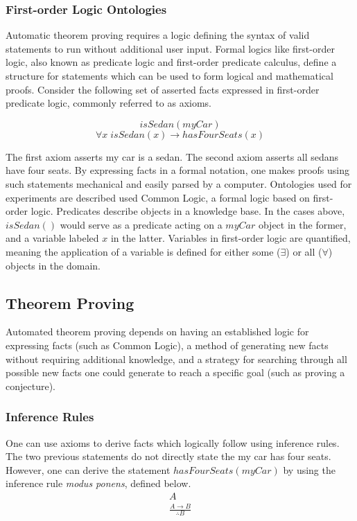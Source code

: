 \documentclass{article}
\begin{document}
\subsubsection{First-order Logic Ontologies}

Automatic theorem proving requires a logic defining the syntax of valid statements to run without additional user input. Formal logics like first-order logic, also known as predicate logic and first-order predicate calculus, define a structure for statements which can be used to form logical and mathematical proofs. Consider the following set of asserted facts expressed in first-order predicate logic, commonly referred to as axioms. 

\begin{singlespace}
\[isSedan(myCar)\]
\[\forall x \; isSedan(x) \rightarrow hasFourSeats(x)\]
\end{singlespace} 

The first axiom asserts my car is a sedan. The second axiom asserts all sedans have four seats. By expressing facts in a formal notation, one makes proofs using such statements mechanical and easily parsed by a computer. Ontologies used for experiments are described used Common Logic, a formal logic based on first-order logic. Predicates describe objects in a knowledge base. In the cases above, $isSedan()$ would serve as a predicate acting on a $myCar$ object in the former, and a variable labeled $x$ in the latter. Variables in first-order logic are quantified, meaning the application of a variable is defined for either some ($\exists$) or all ($\forall$) objects in the domain. 

\subsection{{Theorem Proving}}
Automated theorem proving depends on having an established logic for expressing facts (such as Common Logic), a method of generating new facts without requiring additional knowledge, and a strategy for searching through all possible new facts one could generate to reach a specific goal (such as proving a conjecture).

\subsubsection{Inference Rules}

One can use axioms to derive facts which logically follow using inference rules. The two previous statements do not directly state the my car has four seats. However, one can derive the statement $hasFourSeats(myCar)$ by using the inference rule \textit{modus ponens}, defined below. 
\begin{equation}
\begin{gathered}
A \\
\frac{A \rightarrow B}{\therefore B}
\end{gathered}
\end{equation}
\end{document}
